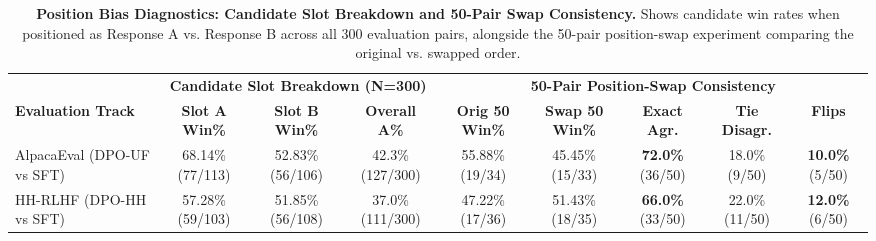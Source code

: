 \begin{table}[t]
\centering
\small
\caption{\textbf{Position Bias Diagnostics: Candidate Slot Breakdown and 50-Pair Swap Consistency.} Shows candidate win rates when positioned as Response A vs. Response B across all 300 evaluation pairs, alongside the 50-pair position-swap experiment comparing the original vs. swapped order.}
\label{tab:position_bias}
\begin{tabularx}{\textwidth}{lcccccccc}
\toprule
& \multicolumn{3}{c}{\textbf{Candidate Slot Breakdown (N=300)}} & \multicolumn{5}{c}{\textbf{50-Pair Position-Swap Consistency}} \\
\cmidrule(lr){2-4} \cmidrule(lr){5-9}
\textbf{Evaluation Track} & \textbf{Slot A Win\%} & \textbf{Slot B Win\%} & \textbf{Overall A\%} & \textbf{Orig 50 Win\%} & \textbf{Swap 50 Win\%} & \textbf{Exact Agr.} & \textbf{Tie Disagr.} & \textbf{Flips} \\
\midrule
AlpacaEval (DPO-UF vs SFT) & 68.14\% (77/113) & 52.83\% (56/106) & 42.3\% (127/300) & 55.88\% (19/34) & 45.45\% (15/33) & \textbf{72.0\%} (36/50) & 18.0\% (9/50) & \textbf{10.0\%} (5/50) \\
HH-RLHF (DPO-HH vs SFT) & 57.28\% (59/103) & 51.85\% (56/108) & 37.0\% (111/300) & 47.22\% (17/36) & 51.43\% (18/35) & \textbf{66.0\%} (33/50) & 22.0\% (11/50) & \textbf{12.0\%} (6/50) \\
\bottomrule
\end{tabularx}
\end{table}